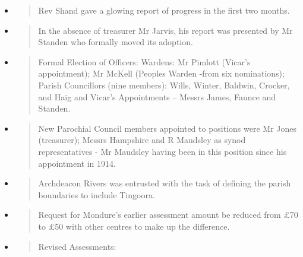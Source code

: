 \begin{itemize}
\item
  \begin{quote}
  Rev Shand gave a glowing report of progress in the first two months.
  \end{quote}
\item
  \begin{quote}
  In the absence of treasurer Mr Jarvis, his report was presented by Mr
  Standen who formally moved its adoption.
  \end{quote}
\item
  \begin{quote}
  Formal Election of Officers: Wardens: Mr Pimlott (Vicar's
  appointment); Mr McKell (Peoples Warden -from six nominations); Parish
  Councillors (nine members): Wills, Winter, Baldwin, Crocker, and Haig
  and Vicar's Appointments -- Messrs James, Faunce and Standen.
  \end{quote}
\item
  \begin{quote}
  New Parochial Council members appointed to positions were Mr Jones
  (treasurer); Messrs Hampshire and R Maudsley as synod representatives
  - Mr Maudsley having been in this position since his appointment in
  1914.
  \end{quote}
\item
  \begin{quote}
  Archdeacon Rivers was entrusted with the task of defining the parish
  boundaries to include Tingoora.
  \end{quote}
\item
  \begin{quote}
  Request for Mondure's earlier assessment amount be reduced from £70 to
  £50 with other centres to make up the difference.
  \end{quote}
\item
  \begin{quote}
  Revised Assessments:
  \end{quote}


\end{itemize}
